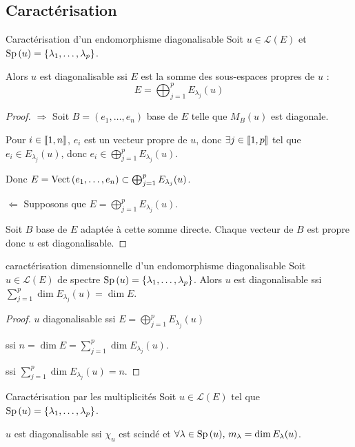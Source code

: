 \subsection{Caractérisation}

\begin{theoreme}{Caractérisation d'un endomorphisme diagonalisable}{}
    Soit $u \in \mathscr L(E)$ et $\operatorname{Sp} \,(u) = \{\lambda_1, \ldots, \lambda_p\}$.

    Alors $u$ est diagonalisable ssi $E$ est la somme des sous-espaces propres de $u$ :
    $$E = \bigoplus_{j = 1 }^{ p } E_{\lambda_j}(u)$$
\end{theoreme}


\begin{proof}
    $\Rightarrow$ Soit $B = (e_1, \ldots, e_n)$ base de $E$ telle que $M_B(u)$ est diagonale.

    Pour $i \in [\![1, n]\!]$, $e_i$ est un vecteur propre de $u$, donc $\exists j \in [\![1, p]\!]$
    tel que $e_i \in E_{\lambda_j}(u)$, donc $e_i \in \bigoplus_{j = 1 }^{ p } E_{\lambda_j}(u)$.

    Donc $E = \operatorname{Vect} \,(e_1, \ldots, e_n) \subset \bigoplus_{j = 1 }^{ p } E_{\lambda_j}(u)$.

    \lvspace $\Leftarrow$ Supposons que $\displaystyle E = \bigoplus_{j = 1 }^{ p } E_{\lambda_j}(u)$.

    Soit $B$ base de $E$ adaptée à cette somme directe. Chaque vecteur de $B$ est propre donc 
    $u$ est diagonalisable.
\end{proof}

\begin{corollairent}{caractérisation dimensionnelle d'un endomorphisme diagonalisable}{}
    Soit $u \in \mathscr L(E)$ de spectre $\operatorname{Sp} \,(u) = \{\lambda_1, \ldots, \lambda_p\}$.
    Alors $u$ est diagonalisable ssi $\displaystyle \sum_{j = 1 }^{p } \dim E_{\lambda_j}(u) = \dim E$.
\end{corollairent}

\begin{proof}
    $u$ diagonalisable ssi $\displaystyle E = \bigoplus_{j = 1 }^{ p } E_{\lambda_j}(u)$
    
    ssi $\displaystyle n = \dim E = \sum_{j = 1 }^{ p } \dim E_{\lambda_j}(u)$.

    ssi $\displaystyle \sum_{j = 1 }^{ p } \dim E_{\lambda_j}(u) = n$.
\end{proof}


\begin{theoreme}{Caractérisation par les multiplicités}{}
    Soit $u \in \mathscr L(E)$ tel que $\operatorname{Sp} \,(u) = \{\lambda_1, \ldots, \lambda_p\}$.

    $u$ est diagonalisable ssi $\chi_u$ est scindé et $\forall \lambda \in \operatorname{Sp} \,(u), \, m_\lambda = \dim E_\lambda(u)$.
\end{theoreme}

